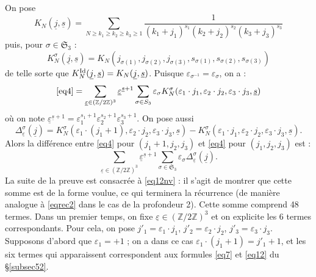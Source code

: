 \documentclass[12pt,francais, reqno]{smfart}
\numberwithin{equation}{section}
\newcommand{\Id}{{\rm Id}}
\newcommand{\Z}{\mathbb Z}
\newcommand{\strois}{\mathfrak{S}_3}
\newcommand{\zdzt}{(\Z / 2 \Z)^3}
\newcommand{\eps}{\varepsilon}
\newcommand{\epssoul}{\underline{\eps}}
\newcommand{\jsoul}{\underline{j}}
\newcommand{\ssoul}{\underline{s}}
\begin{document}
On pose 
$$K_N(\jsoul, \ssoul) = \sum_{N \geq k_1 \geq k_2  \geq k_3  \geq 1}  \frac{1}{(k_1+j_1)^{s_1} (k_2+j_2)^{s_2} (k_3+j_3)^{s_3}}$$
puis, pour $\sigma \in \strois$ : 
$$K_N^\sigma (\jsoul, \ssoul)  = K_N (j_{\sigma(1)}, j_{\sigma(2)}, j_{\sigma(3)}, s_{\sigma(1)}, s_{\sigma(2)}, s_{\sigma(3)})$$
de telle sorte que $K_N^{\Id} (\jsoul, \ssoul) = K_N  (\jsoul, \ssoul) $. Puisque $\eps_{\sigma^{-1}} = \eps_{\sigma}$, on a : 
$$\eqref{eq4} = \sum_{\epssoul \in \zdzt} \epssoul ^{\ssoul + 1} \sum_{\sigma \in \strois} \eps_\sigma
K_N^\sigma (\eps_1 \cdot j_1, \eps_2 \cdot j_2, \eps_3 \cdot j_3, \ssoul)$$
o\`u on note 
$\epssoul ^{\ssoul + 1}  = \eps_1 ^{s_1+ 1} \eps_2 ^{s_2+ 1} \eps_3 ^{s_3+ 1} .$
On pose aussi 
$$\Delta_{\epssoul} ^\sigma (\jsoul) = 
K_N^\sigma (\eps_1 \cdot (j_1+1), \eps_2 \cdot j_2, \eps_3 \cdot j_3, \ssoul)
- K_N^\sigma (\eps_1 \cdot j_1, \eps_2 \cdot j_2, \eps_3 \cdot j_3, \ssoul).$$
Alors la diff\'erence entre \eqref{eq4} pour $(j_1+1, j_2, j_3)$ et \eqref{eq4} pour $(j_1, j_2, j_3)$ est :
\begin{equation} \label{eq12nv} 
\sum_{\epssoul \in \zdzt} \epssoul ^{\ssoul + 1} \sum_{\sigma \in \strois} \eps_\sigma \Delta_{\epssoul} ^\sigma (\jsoul) .
\end{equation}
La suite de la preuve est consacr\'ee \`a \eqref{eq12nv} : il s'agit de montrer que cette somme est de la forme voulue, ce qui terminera la r\'ecurrence (de mani\`ere analogue \`a \eqref{eqrec2} dans le cas de la profondeur 2). Cette somme comprend 48 termes. Dans un premier temps, on fixe $\epssoul \in \zdzt$ et on explicite les 6 termes correspondants. Pour cela, on pose $j'_1 = \eps_1 \cdot j_1$, $j'_2 = \eps_2 \cdot j_2$,  $j'_3 = \eps_3 \cdot j_3$. Supposons d'abord que $\eps_1 =  + 1$ ; on a dans ce cas $\eps_1 \cdot (j_1+1) = j'_1 + 1$, et les six termes qui apparaissent correspondent aux formules  \eqref{eq7} et \eqref{eq12} du \S \ref{subsec52}. 
\end{document}
